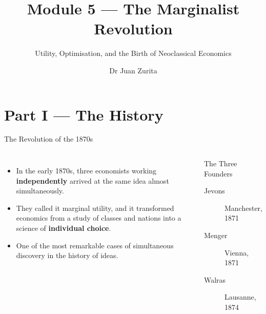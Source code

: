 \documentclass[aspectratio=169, 10pt]{beamer}
\title{Module 5 --- The Marginalist Revolution}
\subtitle{Utility, Optimisation, and the Birth of Neoclassical Economics}
\author{Dr Juan Zurita}
\institute{From Smith to Simulation\\
The University of Edinburgh~$\cdot$~School of Economics}
\date{}
\begin{document}
\maketitle

\section{Part I --- The History}

\begin{frame}{The Revolution of the 1870s}
\begin{columns}[T]
\begin{itemize}
  \item In the early 1870s, three economists working \textbf{independently}
        arrived at the same idea almost simultaneously.
  \item They called it \alert{marginal utility}, and it transformed economics
        from a study of classes and nations into a science of
        \textbf{individual choice}.
  \item One of the most remarkable cases of simultaneous discovery
        in the history of ideas.
\end{itemize}
\begin{block}{The Three Founders}
\begin{description}
  \item[Jevons] Manchester, 1871
  \item[Menger] Vienna, 1871
  \item[Walras] Lausanne, 1874
\end{description}
\end{block}
\end{columns}
\end{frame}
\end{document}
